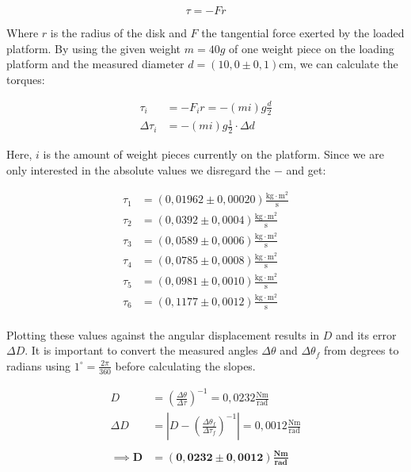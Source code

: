 \documentclass{article}
\begin{document}
\begin{equation}
    \tau = -Fr
\end{equation}

Where $r$ is the radius of the disk and $F$ the tangential force exerted by the loaded platform. By using the given weight $m=40g$ of one weight piece on the loading platform and the measured diameter $d = (10,0\pm0,1)$cm, we can calculate the torques:

\begin{equation}
\begin{split}
    \tau_i &= -F_ir = -(mi) g \frac{d}{2} \\
    \Delta \tau_i &= -(mi) g \frac{1}{2} \cdot \Delta d
\end{split}
\end{equation}

Here, $i$ is the amount of weight pieces currently on the platform. Since we are only interested in the absolute values we disregard the $-$ and get:

\begin{equation}
    \begin{split}
        \tau_1 &= (0,01962 \pm 0,00020) \frac{\text{kg} \cdot \text{m}^2}{\text{s}} \\
        \tau_2 &= (0,0392 \pm 0,0004) \frac{\text{kg} \cdot \text{m}^2}{\text{s}} \\
        \tau_3 &= (0,0589 \pm 0,0006) \frac{\text{kg} \cdot \text{m}^2}{\text{s}} \\
        \tau_4 &= (0,0785 \pm 0,0008) \frac{\text{kg} \cdot \text{m}^2}{\text{s}} \\
        \tau_5 &= (0,0981 \pm 0,0010) \frac{\text{kg} \cdot \text{m}^2}{\text{s}} \\
        \tau_6 &= (0,1177 \pm 0,0012) \frac{\text{kg} \cdot \text{m}^2}{\text{s}} \\
    \end{split}
\end{equation}

Plotting these values against the angular displacement results in $D$ and its error $\Delta D$. It is important to convert the measured angles $\Delta \theta$ and $\Delta \theta_f$ from degrees to radians using $1^\circ = \frac{2\pi}{360}$ before calculating the slopes.

\begin{equation}
    \begin{split}
        D &= \left( \frac{\Delta \theta}{\Delta \tau} \right)^{-1} = 0,0232 \frac{\text{Nm}}{\text{rad}} \\
        \Delta D &= \left| D - \left( \frac{\Delta \theta_f}{\Delta \tau_f} \right)^{-1} \right| = 0,0012 \frac{\text{Nm}}{\text{rad}} \\ \\
        \implies \bm{D} &= \bm{(0,0232 \pm 0,0012)} \frac{\textbf{Nm}}{\textbf{rad}}
    \end{split}
\end{equation}
\end{document}
